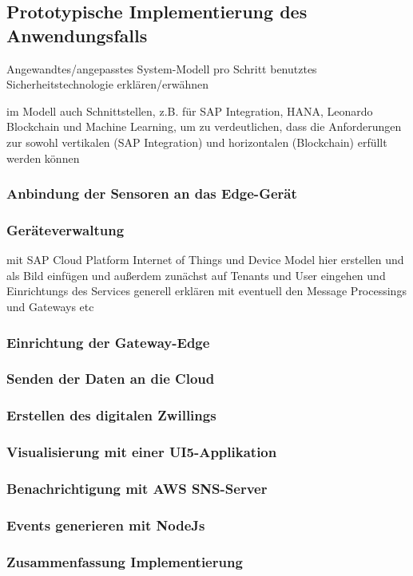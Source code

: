 
\subsection{Prototypische Implementierung des Anwendungsfalls}
Angewandtes/angepasstes System-Modell
pro Schritt benutztes Sicherheitstechnologie erklären/erwähnen

im Modell auch Schnittstellen, z.B. für SAP Integration, HANA, Leonardo Blockchain und Machine Learning, um zu verdeutlichen, dass die Anforderungen zur sowohl vertikalen (SAP Integration) und horizontalen (Blockchain) erfüllt werden können

\subsubsection{Anbindung der Sensoren an das Edge-Gerät}

\subsubsection{Geräteverwaltung}
mit SAP Cloud Platform Internet of Things und Device Model hier erstellen und als Bild einfügen und außerdem
zunächst auf Tenants und User eingehen und Einrichtungs des Services generell erklären mit eventuell den Message Processings
und Gateways etc

\subsubsection{Einrichtung der Gateway-Edge}

\subsubsection{Senden der Daten an die Cloud}

\subsubsection{Erstellen des digitalen Zwillings}

\subsubsection{Visualisierung mit einer UI5-Applikation}

\subsubsection{Benachrichtigung mit AWS SNS-Server}

\subsubsection{Events generieren mit NodeJs}

\subsubsection{Zusammenfassung Implementierung}

\newpage
